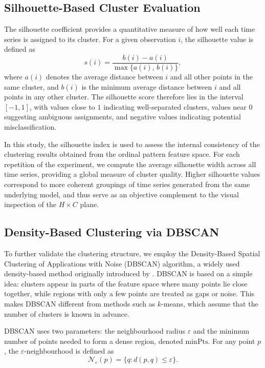 \documentclass[12pt,a4paper]{article}
\begin{document}
\subsection{Silhouette-Based Cluster Evaluation}
The silhouette coefficient provides a quantitative measure of how well each time series is assigned to its cluster. 
For a given observation $i$, the silhouette value is defined as
\[
s(i) = \frac{b(i) - a(i)}{\max\{a(i),\, b(i)\}},
\]
where $a(i)$ denotes the average distance between $i$ and all other points in the same cluster, and $b(i)$ is the minimum average distance between $i$ and all points in any other cluster. 
The silhouette score therefore lies in the interval $[-1,1]$, with values close to $1$ indicating well-separated clusters, values near $0$ suggesting ambiguous assignments, and negative values indicating potential misclassification.

In this study, the silhouette index is used to assess the internal consistency of the clustering results obtained from the ordinal pattern feature space. 
For each repetition of the experiment, we compute the average silhouette width across all time series, providing a global measure of cluster quality. 
Higher silhouette values correspond to more coherent groupings of time series generated from the same underlying model, and thus serve as an objective complement to the visual inspection of the $H \times C$ plane.

\subsection{Density-Based Clustering via DBSCAN}

To further validate the clustering structure, we employ the Density-Based Spatial Clustering of Applications with Noise (DBSCAN) algorithm, a widely used density-based method originally introduced by \cite{Ester1996}. 
DBSCAN is based on a simple idea: clusters appear in parts of the feature space where many points lie close together, while regions with only a few points are treated as gaps or noise. 
This makes DBSCAN different from methods such as $k$-means, which assume that the number of clusters is known in advance.

DBSCAN uses two parameters: the neighbourhood radius $\varepsilon$ and the minimum number of points needed to form a dense region, denoted $\text{minPts}$. 
For any point $p$, the $\varepsilon$-neighbourhood is defined as
\[
\mathcal{N}_\varepsilon(p) = \{q : d(p,q) \le \varepsilon\}.
\]
\end{document}
